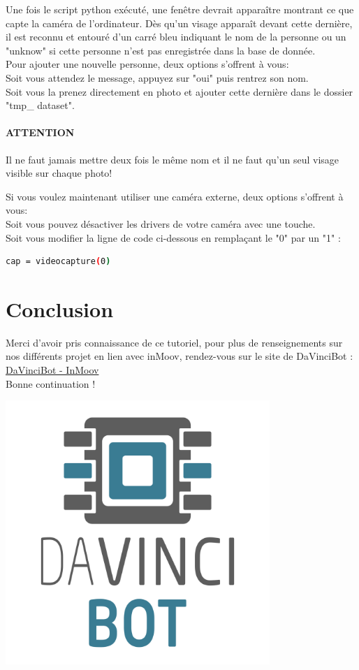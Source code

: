 \documentclass[12pt, oneside]{article}
\begin{document}
Une fois le script python exécuté, une fenêtre devrait apparaître montrant ce que capte la caméra de l'ordinateur. Dès qu'un visage apparaît devant cette dernière, il est reconnu et entouré d'un carré bleu indiquant le nom de la personne ou un "unknow" si cette personne n'est pas enregistrée dans la base de donnée. \\
Pour ajouter une nouvelle personne, deux options s'offrent à vous:\\
Soit vous attendez le message, appuyez sur "oui" puis rentrez son nom.\\
Soit vous la prenez directement en photo et ajouter cette dernière dans le dossier  "tmp\_ dataset".

\paragraph{ATTENTION} Il ne faut jamais mettre deux fois le même nom et il ne faut qu'un seul visage visible sur chaque photo!
\vspace{1cm}

\newpage
Si vous voulez maintenant utiliser une caméra externe, deux options s'offrent à vous:\\
Soit vous pouvez désactiver les drivers de votre caméra avec une touche. \\
Soit vous modifier la ligne de code ci-dessous en remplaçant le "0" par un "1" :
\begin{lstlisting}[language=bash]
  cap = videocapture(0) 
\end{lstlisting}

\section{Conclusion}
Merci d'avoir pris connaissance de ce tutoriel, pour plus de renseignements sur nos différents projet en lien avec inMoov, rendez-vous sur le site de DaVinciBot : \href{http://davincibot.org/inmoov/}{DaVinciBot - InMoov} \\
Bonne continuation !

\vspace{2cm}
\begin{center}
	\includegraphics[width = 10cm]{Images/DaVinciBot_Square.png}
\end{center}
\end{document}
